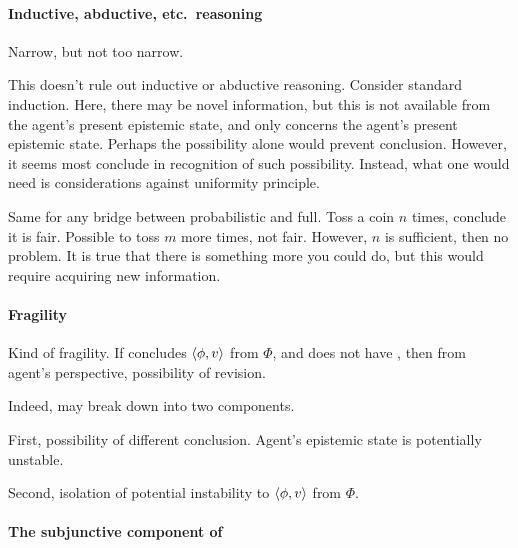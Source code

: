 \paragraph*{Inductive, abductive, etc.\ reasoning}

\begin{note}
  Narrow, but not too narrow.
\end{note}

\begin{note}
  This doesn't rule out inductive or abductive reasoning.
  Consider standard induction.
  Here, there may be novel information, but this is not available from the agent's present epistemic state, and \qzs{} only concerns the agent's present epistemic state.
  Perhaps the possibility alone would prevent conclusion.
  However, it seems most conclude in recognition of such possibility.
  Instead, what one would need is considerations against uniformity principle.

  Same for any bridge between probabilistic and full.
  Toss a coin \(n\) times, conclude it is fair.
  Possible to toss \(m\) more times, not fair.
  However, \(n\) is sufficient, then no problem.
  It is true that there is something more you could do, but this would require acquiring new information.
\end{note}

\paragraph*{Fragility}

\begin{note}
  Kind of fragility.
  If concludes \(\langle \phi, v \rangle\) from \(\Phi\), and does not have \zs{}, then from agent's perspective, possibility of revision.

  Indeed, may break down into two components.

  First, possibility of different conclusion.
  Agent's epistemic state is potentially unstable.

  Second, isolation of potential instability to \(\langle \phi, v \rangle\) from \(\Phi\).
\end{note}

\paragraph*{The subjunctive component of \zs{}}


